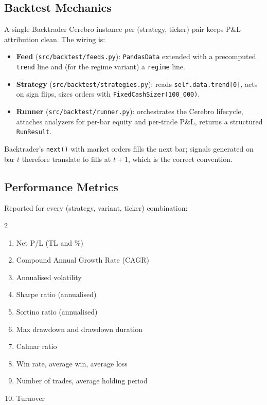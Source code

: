 \documentclass[11pt,a4paper]{article}
\begin{document}
\subsection{Backtest Mechanics}

A single Backtrader Cerebro instance per (strategy, ticker) pair keeps P\&L
attribution clean. The wiring is:

\begin{itemize}[leftmargin=1.5em,itemsep=2pt]
    \item \textbf{Feed} (\texttt{src/backtest/feeds.py}):
          \texttt{PandasData} extended with a precomputed \texttt{trend} line
          and (for the regime variant) a \texttt{regime} line.
    \item \textbf{Strategy} (\texttt{src/backtest/strategies.py}): reads
          \texttt{self.data.trend[0]}, acts on sign flips, sizes orders with
          \texttt{FixedCashSizer(100\_000)}.
    \item \textbf{Runner} (\texttt{src/backtest/runner.py}): orchestrates the
          Cerebro lifecycle, attaches analyzers for per-bar equity and
          per-trade P\&L, returns a structured \texttt{RunResult}.
\end{itemize}

Backtrader's \texttt{next()} with market orders fills the next bar; signals
generated on bar $t$ therefore translate to fills at $t+1$, which is the
correct convention.

\subsection{Performance Metrics}

Reported for every (strategy, variant, ticker) combination:
\begin{multicols}{2}
\begin{enumerate}[leftmargin=1.4em,itemsep=1pt]
    \item Net P/L (TL and \%)
    \item Compound Annual Growth Rate (CAGR)
    \item Annualised volatility
    \item Sharpe ratio (annualised)
    \item Sortino ratio (annualised)
    \item Max drawdown and drawdown duration
    \item Calmar ratio
    \item Win rate, average win, average loss
    \item Number of trades, average holding period
    \item Turnover
\end{enumerate}
\end{multicols}
\end{document}
